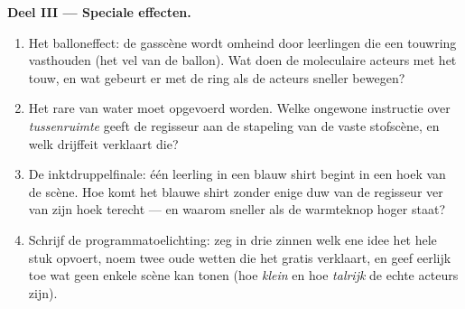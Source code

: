 \begin{problem}
\medskip\noindent\textbf{Deel III --- Speciale effecten.}
\begin{enumerate}[resume]
  \item Het balloneffect: de gasscène wordt omheind door leerlingen
        die een touwring vasthouden (het vel van de ballon). Wat doen
        de moleculaire acteurs met het touw, en wat gebeurt er met de
        ring als de acteurs sneller bewegen?
  \item Het rare  van water moet opgevoerd worden. Welke
        ongewone instructie over \emph{tussenruimte} geeft de
        regisseur aan de stapeling van de vaste stofscène, en welk
        drijffeit verklaart die?
  \item De inktdruppelfinale: één leerling in een blauw shirt begint
        in een hoek van de \emph{}scène. Hoe komt het blauwe
        shirt zonder enige duw van de regisseur ver van zijn hoek
        terecht --- en waarom sneller als de warmteknop hoger staat?
  \item Schrijf de programmatoelichting: zeg in drie zinnen welk ene
        idee het hele stuk opvoert, noem twee oude wetten die het
        gratis verklaart, en geef eerlijk toe wat geen enkele scène
        kan tonen (hoe \emph{klein} en hoe \emph{talrijk} de echte
        acteurs zijn).
\end{enumerate}
\end{problem}
